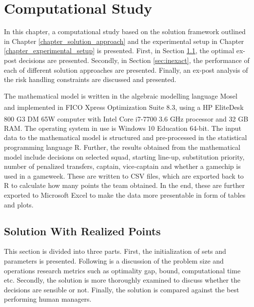
\chapter{Computational Study} \label{chapter_computational_study}


In this chapter, a computational study based on the solution framework outlined in Chapter \ref{chapter_solution_approach} and the experimental setup in Chapter \ref{chapter_experimental_setup} is presented. First, in Section \ref{sec:exact}, the optimal ex-post decisions are presented. Secondly, in Section \ref{sec:inexact}, the performance of each of different solution approaches are presented. Finally, an ex-post analysis of the risk handling constraints are discussed and presented. 

\newpar

The mathematical model is written in the algebraic modelling language Mosel and implemented in FICO\textsuperscript {\textregistered} Xpress Optimization Suite 8.3, using a HP EliteDesk 800 G3 DM 65W computer with Intel\textsuperscript{\textregistered} Core\textsuperscript{\texttrademark} i7-7700 3.6 GHz processor and 32 GB RAM. The operating system in use is Windows 10 Education 64-bit. The input data to the mathematical model is structured and pre-processed in the statistical programming language R. Further, the results obtained from the mathematical model include decisions on selected squad, starting line-up, substitution priority, number of penalized transfers, captain, vice-captain and whether a gamechip is used in a gameweek. These are written to CSV files, which are exported back to R to calculate how many points the team obtained. In the end, these are further exported to Microsoft Excel to make the data more presentable in form of tables and plots. 

\section{Solution With Realized Points}\label{sec:exact}
This section is divided into three parts. First, the initialization of sets and parameters is presented. Following is a discussion of the problem size and operations research metrics such as optimality gap, bound, computational time etc. Secondly, the solution is more thoroughly examined to discuss whether the decisions are sensible or not. Finally, the solution is compared against the best performing human managers. 



